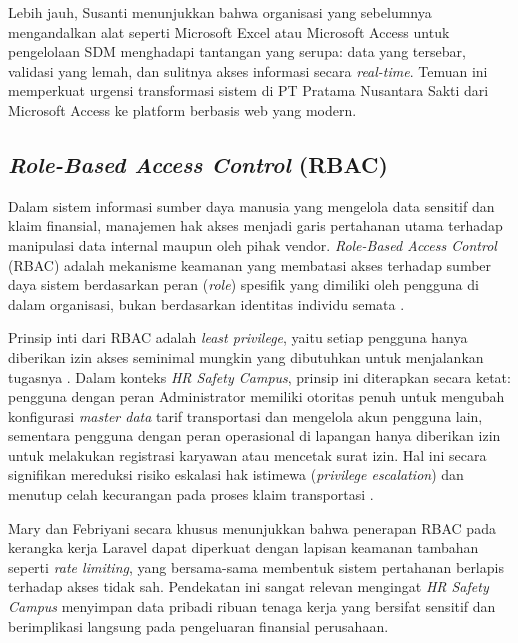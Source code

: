 Lebih jauh, Susanti \cite{susanti2025hris} menunjukkan bahwa organisasi yang
sebelumnya mengandalkan alat seperti Microsoft Excel atau Microsoft Access untuk
pengelolaan SDM menghadapi tantangan yang serupa: data yang tersebar, validasi
yang lemah, dan sulitnya akses informasi secara \textit{real-time}. Temuan ini
memperkuat urgensi transformasi sistem di PT Pratama Nusantara Sakti dari
Microsoft Access ke platform berbasis web yang modern.

\subsection{\textit{Role-Based Access Control} (RBAC)}

Dalam sistem informasi sumber daya manusia yang mengelola data sensitif dan
klaim finansial, manajemen hak akses menjadi garis pertahanan utama terhadap
manipulasi data internal maupun oleh pihak vendor. \textit{Role-Based Access
Control} (RBAC) adalah mekanisme keamanan yang membatasi akses terhadap
sumber daya sistem berdasarkan peran (\textit{role}) spesifik yang dimiliki
oleh pengguna di dalam organisasi, bukan berdasarkan identitas individu semata
\cite{yuricha2023rbac}.

Prinsip inti dari RBAC adalah \textit{least privilege}, yaitu setiap pengguna
hanya diberikan izin akses seminimal mungkin yang dibutuhkan untuk menjalankan
tugasnya \cite{yuricha2023rbac}. Dalam konteks \textit{HR Safety Campus}, prinsip
ini diterapkan secara ketat: pengguna dengan peran Administrator memiliki otoritas
penuh untuk mengubah konfigurasi \textit{master data} tarif transportasi dan
mengelola akun pengguna lain, sementara pengguna dengan peran operasional di
lapangan hanya diberikan izin untuk melakukan registrasi karyawan atau mencetak
surat izin. Hal ini secara signifikan mereduksi risiko eskalasi hak istimewa
(\textit{privilege escalation}) dan menutup celah kecurangan pada proses klaim
transportasi \cite{mary2025rbac}.

Mary dan Febriyani \cite{mary2025rbac} secara khusus menunjukkan bahwa penerapan
RBAC pada kerangka kerja Laravel dapat diperkuat dengan lapisan keamanan tambahan
seperti \textit{rate limiting}, yang bersama-sama membentuk sistem pertahanan
berlapis terhadap akses tidak sah. Pendekatan ini sangat relevan mengingat
\textit{HR Safety Campus} menyimpan data pribadi ribuan tenaga kerja yang bersifat
sensitif dan berimplikasi langsung pada pengeluaran finansial perusahaan.

